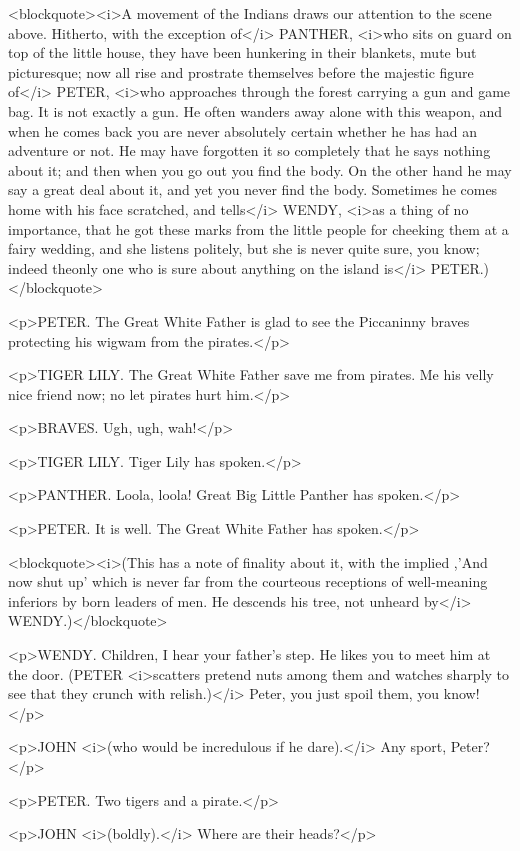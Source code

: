 <blockquote><i>A movement of the Indians draws our attention to the
scene above. Hitherto, with the exception of</i> PANTHER, <i>who sits
on guard on top of the little house, they have been hunkering in
their blankets, mute but picturesque; now all rise and prostrate
themselves before the majestic figure of</i> PETER, <i>who approaches
through the forest carrying a gun and game bag. It is not exactly a
gun. He often wanders away alone with this weapon, and when he comes
back you are never absolutely certain whether he has had an adventure
or not. He may have forgotten it so completely that he says nothing
about it; and then when you go out you find the body. On the other
hand he may say a great deal about it, and yet you never find the
body. Sometimes he comes home with his face scratched, and tells</i>
WENDY, <i>as a thing of no importance, that he got these marks from
the little people for cheeking them at a fairy wedding, and she
listens politely, but she is never quite sure, you know; indeed
theonly one who is sure about anything on the island is</i>
PETER.)</blockquote>

<p>PETER. The Great White Father is glad to see the Piccaninny braves
protecting his wigwam from the pirates.</p>

<p>TIGER LILY. The Great White Father save me from pirates. Me his
velly nice friend now; no let pirates hurt him.</p>

<p>BRAVES. Ugh, ugh, wah!</p>

<p>TIGER LILY. Tiger Lily has spoken.</p>

<p>PANTHER. Loola, loola! Great Big Little Panther has spoken.</p>

<p>PETER. It is well. The Great White Father has spoken.</p>

<blockquote><i>(This has a note of finality about it, with the
implied ,'And now shut up' which is never far from the courteous
receptions of well-meaning inferiors by born leaders of men. He
descends his tree, not unheard by</i> WENDY.)</blockquote>

<p>WENDY. Children, I hear your father's step. He likes you to meet
him at the door. (PETER <i>scatters pretend nuts among them and
watches sharply to see that they crunch with relish.)</i> Peter, you
just spoil them, you know!</p>

<p>JOHN <i>(who would be incredulous if he dare).</i> Any sport,
Peter?</p>

<p>PETER. Two tigers and a pirate.</p>

<p>JOHN <i>(boldly).</i> Where are their heads?</p>

